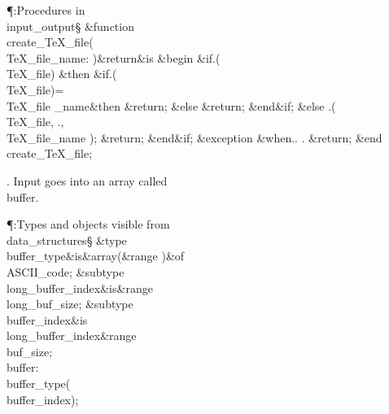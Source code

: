 \Y\P\?\4:Procedures in \\{input\_output}\X\mathrel{+}\S\?\6
\&{function}\8\1\\{create\_TeX\_file}\?(\1\?\\{TeX\_file\_name}\?:\?%
\?\2)\&{return}\?\8\2\8\&{is}\8\1\6
\4\&{begin}\6
\&{if}\1\1\8\?.\?\?\1(\?\\{TeX\_file}\?\2)\?\2\8%
\&{then}\6
\&{if}\1\1\8\?.\?\?\1(\?\\{TeX\_file}\?\2)=\?\\{TeX\_file%
\_name}\2\8\&{then}\6
\?\&{return}\?\8;\6
\4\&{else}\6
\?\&{return}\?\8;\2\6
\&{end}\8\2\&{if}\1;\6
\4\&{else}\6
\?.\?\?\1(\?\?\KR\?\\{TeX\_file}\?,\?%
\?\KR\?\?.\?\?,\?\?\KR\?\\{TeX\_file\_name}%
\?\2)\?;\5
\?\&{return}\?\8;\2\6
\&{end}\8\2\&{if}\1;\6
\1\4\&{exception}\6
\4\&{when}\8\?.\?\?\mathrel{\.|}\?\?.%
\?\?\mathrel{\.|}\?\?.\?\KR\6
\?\&{return}\?\8;\5
\hbox{\2}\2\6
\&{end}\8\\{create\_TeX\_file};\par
\fi

. Input goes into an array called \\{buffer}.

\Y\P\?\4:Types and objects visible from \\{data\_structures}\X\mathrel{+}\S%
\?\6
\&{type}\8\\{buffer\_type}\8\&{is}\?\8\1\&{array}\8\1(\?\8\&{range}%
\?\8\BOX\2)\2\8\&{of}\?\8\\{ASCII\_code};\6
\&{subtype}\8\\{long\_buffer\_index}\8\&{is}\8\8\&{range}\?\to\?%
\\{long\_buf\_size};\6
\&{subtype}\8\\{buffer\_index}\8\&{is}\8\\{long\_buffer\_index}\8\&{range}\?%
\to\?\\{buf\_size};\6
\\{buffer}\?:\?\\{buffer\_type}\?\1(\?\\{buffer\_index}\?\2)\?;\par
\fi

